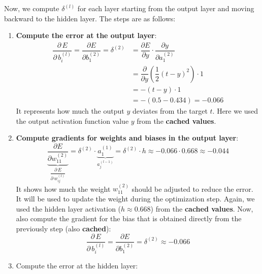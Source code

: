 \begin{examplebox}
    Now, we compute $\delta^{(l)}$ for each layer starting from the output layer and moving backward to the hidden layer.
    The steps are as follows:
    \begin{enumerate}
        \item \textbf{Compute the error at the output layer}:
        \begin{align*}
            \dfrac{\partial \, E}{\partial \, b_{i}^{(l)}} = \dfrac{\partial E}{\partial b_{1}^{(2)}} = \delta^{(2)} & = \dfrac{\partial E}{\partial y} \cdot \dfrac{\partial y}{\partial a_{1}^{(2)}} \\[.3em]
                                                                                                                     & = \dfrac{\partial }{\partial y} \left( \dfrac{1}{2} (t - y)^{2} \right) \cdot 1 \\[.3em]
                                                                                                                     & = -(t - y) \cdot 1 \\
                                                                                                                     & = - (0.5 - 0.434) = -0.066
        \end{align*}
        It represents how much the output $y$ deviates from the target $t$. Here we used the output activation function value $y$ from the \textbf{cached values}.
        \item \textbf{Compute gradients for weights and biases in the output layer}:
        \begin{equation*}
            \underbrace{\dfrac{\partial E}{\partial w_{11}^{(2)}}}_{\dfrac{\partial \, E}{\partial \, w_{ij}^{(l)}}} = \delta^{(2)} \cdot \underbrace{a_{1}^{(1)}}_{a_{j}^{(l-1)}} = \delta^{(2)} \cdot h \approx -0.066 \cdot 0.668 \approx -0.044
        \end{equation*}
        It shows how much the weight $w_{11}^{(2)}$ should be adjusted to reduce the error. It will be used to update the weight during the optimization step. Again, we used the hidden layer activation ($h \approx 0.668$) from the \textbf{cached values}. Now, also compute the gradient for the bias that is obtained directly from the previously step (also \textbf{cached}):
        \begin{equation*}
            \dfrac{\partial \, E}{\partial \, b_{i}^{(l)}} = \dfrac{\partial E}{\partial b_{1}^{(2)}} = \delta^{(2)} \approx -0.066
        \end{equation*}
        \item Compute the error at the hidden layer:

\end{enumerate}
\end{examplebox}
